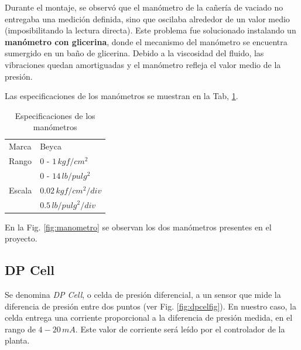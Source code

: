 Durante el montaje, se observó que el manómetro de la cañería de vaciado
no entregaba una medición definida, sino que oscilaba alrededor de un
valor medio (imposibilitando la lectura directa).
Este problema fue solucionado instalando un \textbf{manómetro con glicerina},
donde el mecanismo del manómetro se encuentra sumergido en un baño de glicerina.
Debido a la viscosidad del fluido, las vibraciones quedan amortiguadas
y el manómetro refleja el valor medio de la presión.

Las especificaciones de los manómetros se muestran en la Tab,
\ref{tab:EspManoms}.

\begin{table}[ht]
\renewcommand{\arraystretch}{1.3}
\centering
\begin{tabular}{|l|l|}
\hline
Marca & Beyca\\
Rango & $0$ - $1\,kgf/cm^2$\\
 & $0$ - $14\,lb/pulg^2$\\
Escala & $0.02\,kgf/cm^2/div$\\
& $0.5\,lb/pulg^2/div$\\
\hline
\end{tabular}
\caption{Especificaciones de los manómetros}
\label{tab:EspManoms}
\end{table}

En la Fig. \ref{fig:manometro} se observan los dos manómetros
presentes en el proyecto.

\subsection{DP Cell}
\label{subsec:DPCell}

Se denomina \textit{DP Cell}, o celda de presión diferencial, a un sensor
que mide la diferencia de presión entre dos puntos (ver Fig. \ref{fig:dpcelfig}).
En nuestro caso, la celda entrega una corriente proporcional a la diferencia de
presión medida, en el rango de $4-20\,mA$.
Este valor de corriente será leído por el controlador de la planta.

